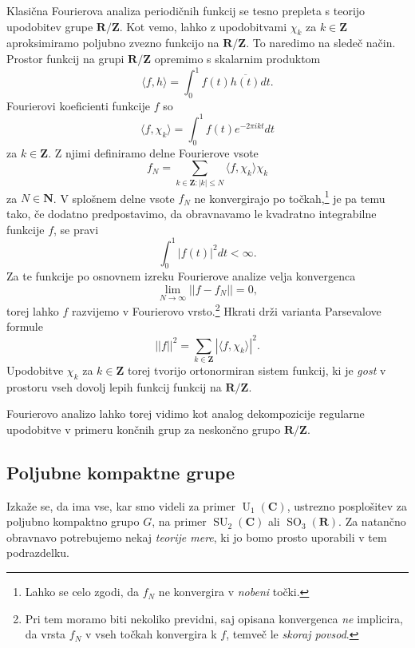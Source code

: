 \documentclass[11pt]{book}
\def\NN{\mathbf{N}}
\def\ZZ{\mathbf{Z}}
\def\RR{\mathbf{R}}
\def\CC{\mathbf{C}}
\DeclareMathOperator\SU{SU}
\DeclareMathOperator\U{U}
\DeclareMathOperator\SO{SO}
\theoremstyle{definition}
\theoremstyle{zgled}
\theoremstyle{odprtproblem}
\theoremstyle{domacanaloga}
\theoremstyle{izrek}
\begin{document}
Klasična Fourierova analiza periodičnih funkcij se tesno prepleta s teorijo upodobitev grupe $\RR/\ZZ$. Kot vemo, lahko z upodobitvami $\chi_k$ za $k \in \ZZ$ aproksimiramo poljubno zvezno funkcijo na $\RR/\ZZ$. To naredimo na sledeč način. Prostor funkcij na grupi $\RR/\ZZ$ opremimo s skalarnim produktom
\[
    \langle f, h \rangle = \int_{0}^{1} f(t) \overline{h(t)} dt.
\]
Fourierovi koeficienti funkcije $f$ so
\[
    \langle f, \chi_k \rangle = \int_0^1 f(t) e^{-2 \pi i k t} dt
\]
za $k \in \ZZ$. Z njimi definiramo delne Fourierove vsote
\[
    f_N = \sum_{k \in \ZZ \colon |k| \leq N} \langle f, \chi_k \rangle \chi_k
\]
za $N \in \NN$. V splošnem delne vsote $f_N$ ne konvergirajo po točkah,\footnote{Lahko se celo zgodi, da $f_N$ ne konvergira v \emph{nobeni} točki.} je pa temu tako, če dodatno predpostavimo, da obravnavamo le kvadratno integrabilne funkcije $f$, se pravi
\[
    \int_0^1 |f(t)|^2 dt < \infty. 
\]
Za te funkcije po osnovnem izreku Fourierove analize velja konvergenca
\[
    \lim_{N \to \infty} || f - f_N || = 0,
\]
torej lahko $f$ razvijemo v Fourierovo vrsto.\footnote{Pri tem moramo biti nekoliko previdni, saj opisana konvergenca \emph{ne} implicira, da vrsta $f_N$ v vseh točkah konvergira k $f$, temveč le \emph{skoraj povsod}.} Hkrati drži varianta Parsevalove formule
\[
  ||f||^2 = \sum_{k \in \ZZ} |\langle f, \chi_k \rangle|^2.
\]
Upodobitve $\chi_k$ za $k \in \ZZ$ torej tvorijo ortonormiran sistem funkcij, ki je \emph{gost} v prostoru vseh dovolj lepih funkcij funkcij na $\RR/\ZZ$. 

Fourierovo analizo lahko torej vidimo kot analog dekompozicije regularne upodobitve v primeru končnih grup za neskončno grupo $\RR/\ZZ$.


\subsection{Poljubne kompaktne grupe}

Izkaže se, da ima vse, kar smo videli za primer $\U_1(\CC)$, ustrezno posplošitev za poljubno kompaktno grupo $G$, na primer $\SU_2(\CC)$ ali $\SO_3(\RR)$. Za natančno obravnavo potrebujemo nekaj \emph{teorije mere}, ki jo bomo prosto uporabili v tem podrazdelku. 
\end{document}
